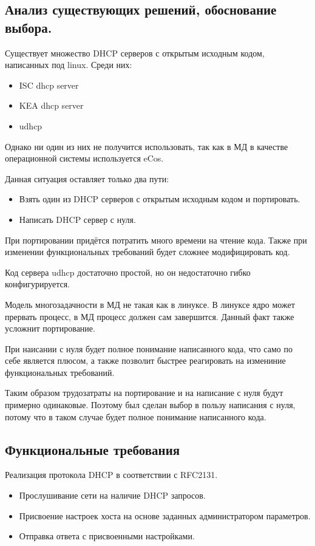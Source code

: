 \documentclass[12pt]{article}
\begin{document}
\subsection{Анализ существующих решений, обоснование выбора.}

Существует множество DHCP серверов с открытым исходным кодом, написанных под linux. Среди них:
\begin{itemize}
    \item ISC dhcp server
    \item KEA dhcp server
    \item udhcp
\end{itemize}

Однако ни один из них не получится использовать, так как в МД в качестве операционной системы используется eCos.

Данная ситуация оставляет только два пути:

\begin{itemize}
    \item Взять один из DHCP серверов с открытым исходным кодом и портировать.
    \item Написать DHCP сервер с нуля.
\end{itemize}

При портировании придётся потратить много времени на чтение кода.
Также при изменении функциональных требований будет сложнее модифицировать код.

Код сервера udhcp достаточно простой, но он недостаточно гибко конфигурируется.

Модель многозадачности в МД не такая как в линуксе.
В линуксе ядро может прервать процесс, в МД процесс должен сам завершится.
Данный факт также усложнит портирование.

При наисании с нуля будет полное понимание написанного кода, что само по себе является плюсом, а также позволит быстрее реагировать на измениние функциональных требований.

Таким образом трудозатраты на портирование и на написание с нуля будут примерно одинаковые.
Поэтому был сделан выбор в пользу написания с нуля, потому что в таком случае будет полное понимание написанного кода.

\subsection{Функциональные требования}

Реализация протокола DHCP в соответствии с RFC2131.
\begin{itemize}
    \item Прослушивание сети на наличие DHCP запросов.
    \item Присвоение настроек хоста на основе заданных администратором параметров.
    \item Отправка ответа с присвоенными настройками.
\end{itemize}
\end{document}
